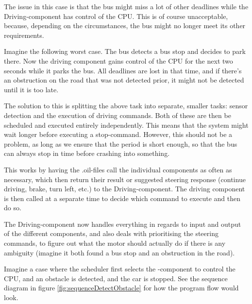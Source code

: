 The issue in this case is that the bus might miss a lot of other deadlines while the Driving-component has control of the CPU. This is of course unacceptable, because, depending on the circumstances, the bus might no longer meet its other requirements. 

Imagine the following worst case. The bus detects a bus stop and decides to park there. Now the driving component gains control of the CPU for the next two seconds while it parks the bus. All deadlines are lost in that time, and if there's an obstruction on the road that was not detected prior, it might not be detected until it is too late.

The solution to this is splitting the above task into separate, smaller tasks: sensor detection and the execution of driving commands. Both of these are then be scheduled and executed entirely independently. This means that the system might wait longer before executing a stop-command. However, this should not be a problem, as long as we ensure that the period is short enough, so that the bus can always stop in time before crashing into something. 

This works by having the .oil-files call the individual components as often as necessary, which then return their result or suggested steering response (continue driving, brake, turn left, etc.) to the Driving-component. The driving component is then called at a separate time to decide which command to execute and then do so.

The Driving-component now handles everything in regards to input and output of the different components, and also deals with prioritising the steering commands, to figure out what the motor should actually do if there is any ambiguity (imagine it both found a bus stop and an obstruction in the road). 

Imagine a case where the scheduler first selects the -component to control the CPU, and an obstacle is detected, and the car is stopped. See the sequence diagram in figure \ref{fig:sequenceDetectObstacle} for how the program flow would look.

